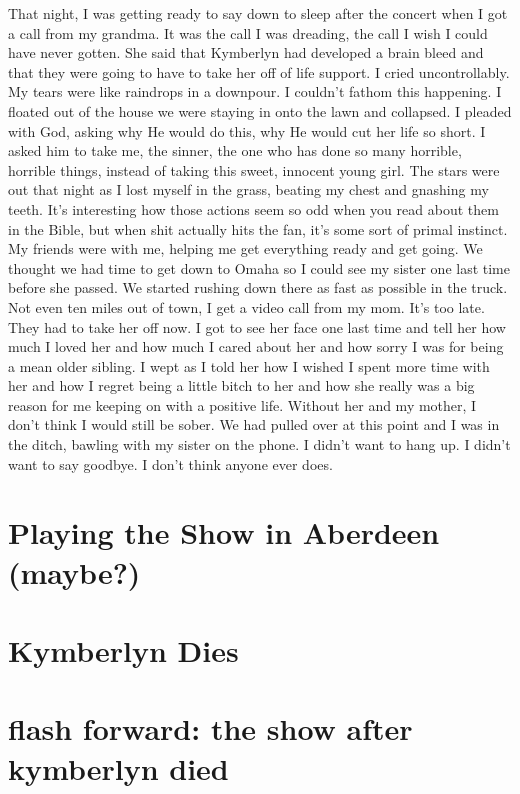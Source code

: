 \documentclass[12pt, letterpaper]{article}
\begin{document}
That night, I was getting ready to say down to sleep after the concert when I got a call from my grandma.
It was the call I was dreading, the call I wish I could have never gotten.
She said that Kymberlyn had developed a brain bleed and that they were going to have to 
take her off of life support.
I cried uncontrollably.
My tears were like raindrops in a downpour.
I couldn't fathom this happening. 
I floated out of the house we were staying in onto the lawn and collapsed.
I pleaded with God, asking why He would do this, why He would cut her life so short.
I asked him to take me, the sinner, the one who has done so many horrible, horrible things, 
instead of taking this sweet, innocent young girl.
The stars were out that night as I lost myself in the grass, beating my chest and gnashing my teeth.
It's interesting how those actions seem so odd when you read about them in the Bible, but
when shit actually hits the fan, it's some sort of primal instinct.
My friends were with me, helping me get everything ready and get going. 
We thought we had time to get down to Omaha so I could see my sister one last time before she passed.
We started rushing down there as fast as possible in the truck.
Not even ten miles out of town, I get a video call from my mom. 
It's too late. 
They had to take her off now.
I got to see her face one last time and tell her how much I loved her and 
how much I cared about her and how sorry I was for being a mean older sibling.
I wept as I told her how I wished I spent more time with her and how I regret being a little bitch 
to her and how she really was a big reason for me keeping on with a positive life.
Without her and my mother, I don't think I would still be sober.
We had pulled over at this point and I was in the ditch, bawling with my sister on the phone.
I didn't want to hang up.
I didn't want to say goodbye.
I don't think anyone ever does.




\section*{Playing the Show in Aberdeen (maybe?)}



\section*{Kymberlyn Dies}




\section*{flash forward: the show after kymberlyn died}
\end{document}
